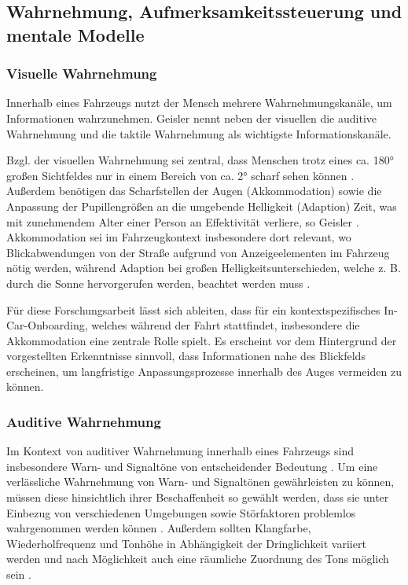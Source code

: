 \subsection{Wahrnehmung, Aufmerksamkeitssteuerung und mentale Modelle}
\label{subsec:wn_as_mm}

\subsubsection{Visuelle Wahrnehmung}
\label{subsubsec:visuelle_wahrnehmung}
Innerhalb eines Fahrzeugs nutzt der Mensch mehrere Wahrnehmungskanäle, um Informationen wahrzunehmen. Geisler \cite{Geisler_hci2021} nennt neben der visuellen die auditive Wahrnehmung und die taktile Wahrnehmung als wichtigste Informationskanäle.

Bzgl. der visuellen Wahrnehmung sei zentral, dass Menschen trotz eines ca. 180° großen Sichtfeldes nur in einem Bereich von ca. 2° scharf sehen können \cite{Geisler_hci2021}. Außerdem benötigen das Scharfstellen der Augen (Akkommodation) sowie die Anpassung der Pupillengrößen an die umgebende Helligkeit (Adaption) Zeit, was mit zunehmendem Alter einer Person an Effektivität verliere, so Geisler \cite{Geisler_hci2021}. Akkommodation sei im Fahrzeugkontext insbesondere dort relevant, wo Blickabwendungen von der Straße aufgrund von Anzeigeelementen im Fahrzeug nötig werden, während Adaption bei großen Helligkeitsunterschieden, welche z. B. durch die Sonne hervorgerufen werden, beachtet werden muss \cite{Geisler_hci2021}.

Für diese Forschungsarbeit lässt sich ableiten, dass für ein kontextspezifisches In-Car-Onboarding, welches während der Fahrt stattfindet, insbesondere die Akkommodation eine zentrale Rolle spielt. Es erscheint vor dem Hintergrund der vorgestellten Erkenntnisse sinnvoll, dass Informationen nahe des Blickfelds erscheinen, um langfristige Anpassungsprozesse innerhalb des Auges vermeiden zu können.

\subsubsection{Auditive Wahrnehmung}
\label{subsubsec:auditive_wahrnehmung}
Im Kontext von auditiver Wahrnehmung innerhalb eines Fahrzeugs sind insbesondere Warn- und Signaltöne von entscheidender Bedeutung \cite{Geisler_hci2021}. Um eine verlässliche Wahrnehmung von Warn- und Signaltönen gewährleisten zu können, müssen diese hinsichtlich ihrer Beschaffenheit so gewählt werden, dass sie unter Einbezug von verschiedenen Umgebungen sowie Störfaktoren problemlos wahrgenommen werden können \cite{Geisler_hci2021}. Außerdem sollten Klangfarbe, Wiederholfrequenz und Tonhöhe in Abhängigkeit der Dringlichkeit variiert werden und nach Möglichkeit auch eine räumliche Zuordnung des Tons möglich sein \cite{Geisler_hci2021}.

